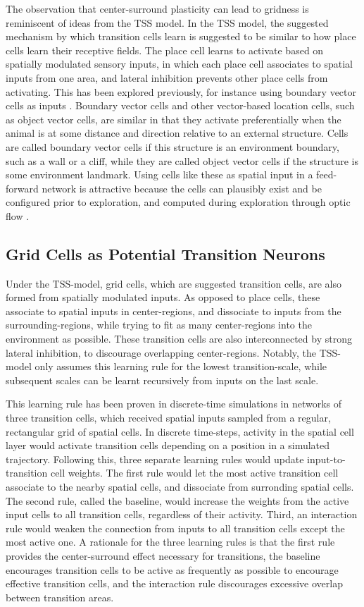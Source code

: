 \documentclass{article}
\begin{document}
    The observation that center-surround plasticity can lead to gridness is reminiscent of ideas from the TSS model. In the TSS model, the suggested mechanism by which transition cells learn is suggested to be similar to how place cells learn their receptive fields. The place cell learns to activate based on spatially modulated sensory inputs, in which each place cell associates to spatial inputs from one area, and lateral inhibition prevents other place cells from activating. This has been explored previously, for instance using boundary vector cells as inputs \parencite{Barry2006}. Boundary vector cells and other vector-based location cells, such as object vector cells, are similar in that they activate preferentially when the animal is at some distance and direction relative to an external structure. Cells are called boundary vector cells if this structure is an environment boundary, such as a wall or a cliff, while they are called object vector cells if the structure is some environment landmark. Using cells like these as spatial input in a feed-forward network is attractive because the cells can plausibly exist and be configured prior to exploration, and computed during exploration through optic flow \parencite{Raudies2012}.

    \subsection{Grid Cells as Potential Transition Neurons}
    Under the TSS-model, grid cells, which are suggested transition cells, are also formed from spatially modulated inputs. As opposed to place cells, these associate to spatial inputs in center-regions, and dissociate to inputs from the surrounding-regions, while trying to fit as many center-regions into the environment as possible. These transition cells are also interconnected by strong lateral inhibition, to discourage overlapping center-regions.
    Notably, the TSS-model only assumes this learning rule for the lowest transition-scale, while subsequent scales can be learnt recursively from inputs on the last scale.

    This learning rule has been proven in discrete-time simulations in networks of three transition cells, which received spatial inputs sampled from a regular, rectangular grid of spatial cells. In discrete time-steps, activity in the spatial cell layer would activate transition cells depending on a position in a simulated trajectory. Following this, three separate learning rules would update input-to-transition cell weights. The first rule would let the most active transition cell associate to the nearby spatial cells, and dissociate from surronding spatial cells. The second rule, called the baseline, would increase the weights from the active input cells to all transition cells, regardless of their activity. Third, an interaction rule would weaken the connection from inputs to all transition cells except the most active one.
    A rationale for the three learning rules is that the first rule provides the center-surround effect necessary for transitions, the baseline encourages transition cells to be active as frequently as possible to encourage effective transition cells, and the interaction rule discourages excessive overlap between transition areas.
    
\end{document}
